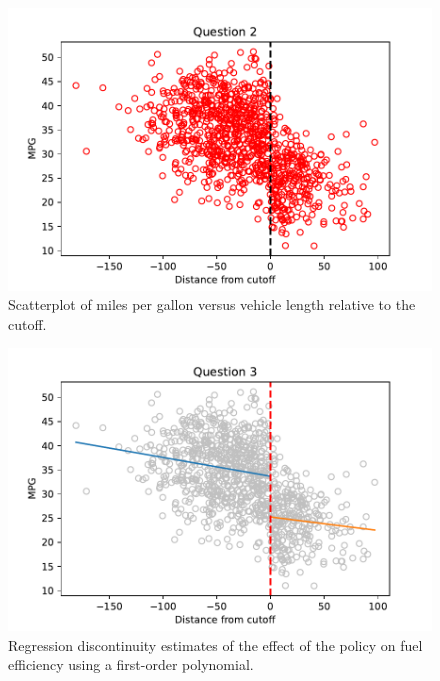 \documentclass{article}
\begin{document}
\clearpage

\begin{figure}[ht]
\centering
\includegraphics{hw6q2.pdf}
\caption{Scatterplot of miles per gallon versus vehicle length relative to the cutoff.}
\label{fig:hw6q2}
\end{figure}

\begin{figure}[ht]
\centering
\includegraphics{hw6q3.pdf}
\caption{Regression discontinuity estimates of the effect of the policy on fuel efficiency using a first-order polynomial.}
\label{fig:hw6q3}
\end{figure}
\end{document}
